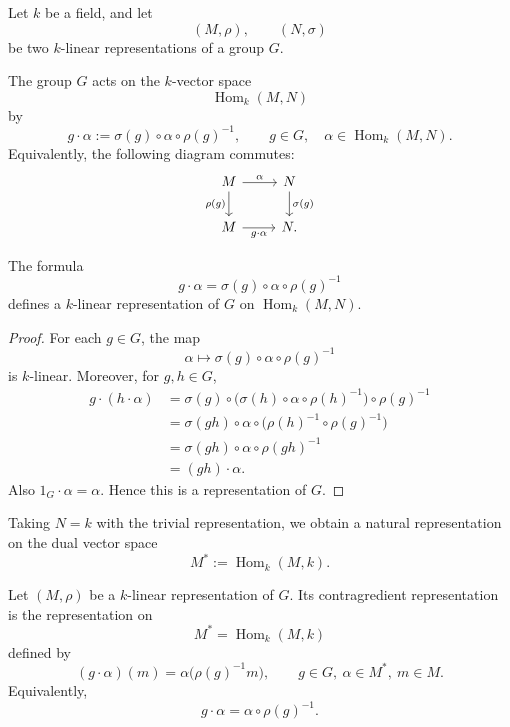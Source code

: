 Let \(k\) be a field, and let
\[
    (M,\rho),\qquad (N,\sigma)
\]
be two \(k\)-linear representations of a group \(G\).

The group \(G\) acts on the \(k\)-vector space
\[
    \operatorname{Hom}_k(M,N)
\]
by
\[
    g\cdot \alpha
    :=
    \sigma(g)\circ \alpha\circ \rho(g)^{-1},
    \qquad
    g\in G,\quad \alpha\in \operatorname{Hom}_k(M,N).
\]
Equivalently, the following diagram commutes:
\[
\begin{tikzcd}
    M \arrow[r,"\alpha"] \arrow[d,"\rho(g)"']
        & N \arrow[d,"\sigma(g)"] \\
    M \arrow[r,"g\cdot \alpha"']
        & N .
\end{tikzcd}
\]

\begin{lemma}
    The formula
    \[
        g\cdot \alpha
        =
        \sigma(g)\circ \alpha\circ \rho(g)^{-1}
    \]
    defines a \(k\)-linear representation of \(G\) on
    \(\operatorname{Hom}_k(M,N)\).
\end{lemma}

\begin{proof}
    For each \(g\in G\), the map
    \[
        \alpha\longmapsto \sigma(g)\circ \alpha\circ \rho(g)^{-1}
    \]
    is \(k\)-linear. Moreover, for \(g,h\in G\),
    \[
    \begin{aligned}
        g\cdot (h\cdot \alpha)
        &=
        \sigma(g)\circ
        \bigl(\sigma(h)\circ \alpha\circ \rho(h)^{-1}\bigr)
        \circ \rho(g)^{-1}  \\
        &=
        \sigma(gh)\circ \alpha\circ
        \bigl(\rho(h)^{-1}\circ \rho(g)^{-1}\bigr) \\
        &=
        \sigma(gh)\circ \alpha\circ \rho(gh)^{-1} \\
        &=
        (gh)\cdot \alpha .
    \end{aligned}
    \]
    Also \(1_G\cdot \alpha=\alpha\). Hence this is a representation of \(G\).
\end{proof}

Taking \(N=k\) with the trivial representation, we obtain a natural representation on
the dual vector space
\[
    M^*:=\operatorname{Hom}_k(M,k).
\]

\begin{definition}
    Let \((M,\rho)\) be a \(k\)-linear representation of \(G\). Its contragredient
    representation is the representation on
    \[
        M^*=\operatorname{Hom}_k(M,k)
    \]
    defined by
    \[
        (g\cdot \alpha)(m)
        =
        \alpha\bigl(\rho(g)^{-1}m\bigr),
        \qquad
        g\in G,\ \alpha\in M^*,\ m\in M.
    \]
    Equivalently,
    \[
        g\cdot \alpha=\alpha\circ \rho(g)^{-1}.
    \]
\end{definition}

